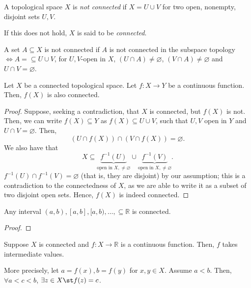 \begin{definition}[Connected]
    A topological space $X$ is \emph{not connected} if $X = U \cup V$ for two open, nonempty, disjoint sets $U, V$. 
    
    If this does not hold, $X$ is said to be \emph{connected}.

    A set $A \subseteq X$ is not connected if $A$ is not connected in the subspace topology $\iff A =\subseteq U \cup V$, for $U, V$-open in $X$, $(U \cap A) \neq \varnothing$, $(V \cap A) \neq \varnothing$ and $U \cap V = \varnothing$.
\end{definition}

\begin{theorem}\label{thm:connectedcontinuousfunction}
    Let $X$ be a connected topological space. Let $f: X \to Y$ be a continuous function. Then, $f(X)$ is also connected.
\end{theorem}

\begin{proof}
    Suppose, seeking a contradiction, that $X$ is connected, but $f(X)$ is not. Then, we can write $f(X) \subseteq Y$ as $f(X) \subseteq U \cup V$, such that $U, V$ open in $Y$ and $U \cap V = \varnothing$. Then, \[
    (U \cap f(X)) \cap (V \cap f(X)) = \varnothing.    
    \]
    We also have that $$X \subseteq \underbrace{f^{-1}(U)}_{\text{open in $X, \neq \varnothing$}} \cup \underbrace{f^{-1}(V)}_{\text{open in $X, \neq \varnothing$}}.$$
    $f^{-1}(U) \cap f^{-1}(V) = \varnothing$ (that is, they are disjoint) by our assumption; this is a contradiction to the connectedness of $X$, as we are able to write it as a subset of two disjoint open sets. Hence, $f(X)$ is indeed connected.
\end{proof}

\begin{lemma}\label{lemma:connectedinterval}
    Any interval $(a, b), [a, b], [a, b), \dots, \subseteq \mathbb{R}$ is connected.
\end{lemma}

\begin{proof}
\end{proof}

\begin{theorem}
    Suppose $X$ is connected and $f: X \to \mathbb{R}$ is a continuous function. Then, $f$ takes intermediate values.

    More precisely, let $a = f(x), b = f(y)$ for $x, y \in X$. Assume $a < b$. Then, $\forall a < c < b$, $\exists z \in X \st f(z) = c$.
\end{theorem}

